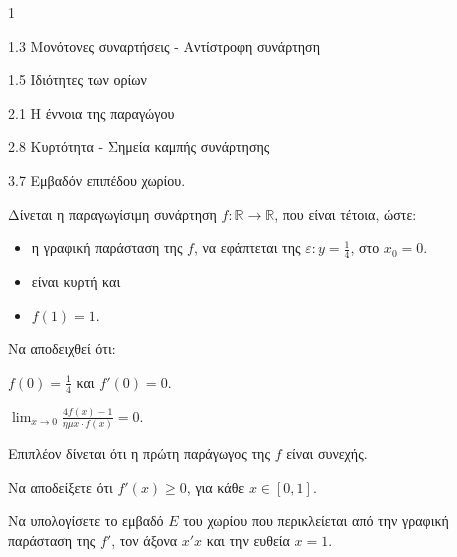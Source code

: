 \begin{ylh}{1}
    \item 1.3 Μονότονες συναρτήσεις - Αντίστροφη συνάρτηση
    \item 1.5 Ιδιότητες των ορίων
    \item 2.1 Η έννοια της παραγώγου
    \item 2.8 Κυρτότητα - Σημεία καμπής συνάρτησης
    \item 3.7 Εμβαδόν επιπέδου χωρίου.
\end{ylh}
Δίνεται η παραγωγίσιμη συνάρτηση $f: \mathbb{R} \rightarrow \mathbb{R}$, που είναι τέτοια, ώστε:
\begin{itemize}
    \item η γραφική παράσταση της $f$, να εφάπτεται της $\varepsilon: y = \frac{1}{4}$, στο $x_0 = 0$.
    \item είναι κυρτή και
    \item $f(1)=1$.
\end{itemize}
\begin{alist}
\item Να αποδειχθεί ότι:
    \begin{rlist}
        \item $f(0)=\frac{1}{4}$ και $f'(0)=0$. 
        \item $\lim_{x \to 0} \frac{4f(x)-1}{\eta\mu x \cdot f(x)}=0$. 
    \end{rlist}
\item Επιπλέον δίνεται ότι η πρώτη παράγωγος της $f$ είναι συνεχής.
    \begin{rlist}
        \item Να αποδείξετε ότι $f'(x) \ge 0$, για κάθε $x \in [0,1]$. 
        \item Να υπολογίσετε το εμβαδό $E$ του χωρίου που περικλείεται από την γραφική παράσταση της $f'$, τον άξονα $x'x$ και την ευθεία $x=1$. 
    \end{rlist}
\end{alist}